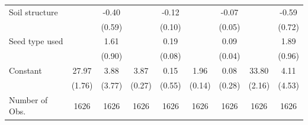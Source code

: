{\begin{tabular}{l*{8}{c}}
Soil structure  &                  &    -0.40         &                  &    -0.12         &                  &    -0.07         &                  &    -0.59         \\
                &                  &   (0.59)         &                  &   (0.10)         &                  &   (0.05)         &                  &   (0.72)         \\
Seed type used  &                  &     1.61\sym{*}  &                  &     0.19\sym{**} &                  &     0.09\sym{**} &                  &     1.89\sym{*}  \\
                &                  &   (0.90)         &                  &   (0.08)         &                  &   (0.04)         &                  &   (0.96)         \\
Constant        &    27.97\sym{***}&     3.88         &     3.87\sym{***}&     0.15         &     1.96\sym{***}&     0.08         &    33.80\sym{***}&     4.11         \\
                &   (1.76)         &   (3.77)         &   (0.27)         &   (0.55)         &   (0.14)         &   (0.28)         &   (2.16)         &   (4.53)         \\
\hline
Number of Obs.  &     1626         &     1626         &     1626         &     1626         &     1626         &     1626         &     1626         &     1626         \\
\hline\hline
\end{tabular}
}
